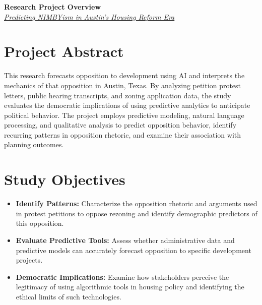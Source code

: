 \documentclass[10pt, letterpaper]{article}
\begin{document}
\pagestyle{fancy}

\vspace*{0.2cm}

\begin{center}
    {\Large \textbf{\color{columbiablue_official} Research Project Overview}} \\[0.4em]
    {\large \textit{\href{https://github.com/dhardestylewis/thesis/blob/main/Submitted/Thesis_Proposal_Submitted/Lewis_Daniel_Thesis_Final_Proposal_December2025.d/Lewis_Daniel_Thesis_Final_Proposal_December2025.pdf}{Predicting NIMBYism in Austin's Housing Reform Era}}}
\end{center}

\vspace{0.2cm}

\section*{Project Abstract}
This research forecasts opposition to development using AI and interprets the mechanics of that opposition in Austin, Texas. By analyzing petition protest letters, public hearing transcripts, and zoning application data, the study evaluates the democratic implications of using predictive analytics to anticipate political behavior. The project employs predictive modeling, natural language processing, and qualitative analysis to predict opposition behavior, identify recurring patterns in opposition rhetoric, and examine their association with planning outcomes.

\section*{Study Objectives}
\begin{itemize}[leftmargin=*, label={\color{columbiablue_official}\tiny$\blacksquare$}, parsep=2pt, itemsep=2pt, topsep=0pt]
    \item \textbf{Identify Patterns:} Characterize the opposition rhetoric and arguments used in protest petitions to oppose rezoning and identify demographic predictors of this opposition.
    \item \textbf{Evaluate Predictive Tools:} Assess whether administrative data and predictive models can accurately forecast opposition to specific development projects.
    \item \textbf{Democratic Implications:} Examine how stakeholders perceive the legitimacy of using algorithmic tools in housing policy and identifying the ethical limits of such technologies.
\end{itemize}
\end{document}
